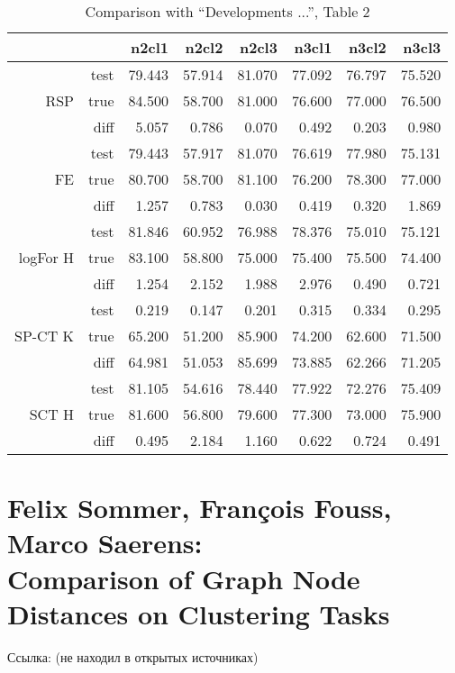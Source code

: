 \documentclass{article}
\begin{document}
\begin{table}[H]
\centering
\caption{Comparison with ``Developments ...'', Table 2}
\label{my-label}
\begin{tabular}{rr|rrrrrr}
         &      & n2cl1  & n2cl2  & n2cl3  & n3cl1  & n3cl2  & n3cl3 \\
         \hline
         & test & 79.443 & 57.914 & 81.070 & 77.092 & 76.797 & 75.520 \\
RSP      & true & 84.500 & 58.700 & 81.000 & 76.600 & 77.000 & 76.500 \\
         & diff & 5.057  & 0.786  & 0.070  & 0.492  & 0.203  & 0.980  \\
         \hline
         & test & 79.443 & 57.917 & 81.070 & 76.619 & 77.980 & 75.131 \\
FE       & true & 80.700 & 58.700 & 81.100 & 76.200 & 78.300 & 77.000 \\
         & diff & 1.257  & 0.783  & 0.030  & 0.419  & 0.320  & 1.869  \\
         \hline
         & test & 81.846 & 60.952 & 76.988 & 78.376 & 75.010 & 75.121 \\
logFor H & true & 83.100 & 58.800 & 75.000 & 75.400 & 75.500 & 74.400 \\
         & diff & 1.254  & 2.152  & 1.988  & 2.976  & 0.490  & 0.721  \\
         \hline
         & test & 0.219  & 0.147  & 0.201  & 0.315  & 0.334  & 0.295  \\
SP-CT K  & true & 65.200 & 51.200 & 85.900 & 74.200 & 62.600 & 71.500 \\
         & diff & \cellcolor{red!25} 64.981 & \cellcolor{red!25} 51.053 & \cellcolor{red!25} 85.699 &
                  \cellcolor{red!25} 73.885 & \cellcolor{red!25} 62.266 & \cellcolor{red!25} 71.205 \\
         \hline
         & test & 81.105 & 54.616 & 78.440 & 77.922 & 72.276 & 75.409 \\
SCT H    & true & 81.600 & 56.800 & 79.600 & 77.300 & 73.000 & 75.900 \\
         & diff & 0.495  & 2.184  & 1.160  & 0.622  & 0.724  & 0.491  
\end{tabular}
\end{table}


\section{Felix Sommer, Fran{\c c}ois Fouss, Marco Saerens:\\
         Comparison of Graph Node Distances on Clustering Tasks}
Ссылка: (не находил в открытых источниках)
\end{document}
